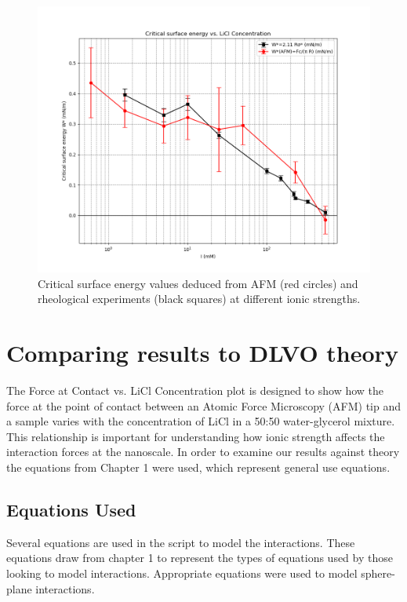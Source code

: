 \begin{figure}[h!]
\centering
\includegraphics[width=\textwidth]{chapter8/Rheology/Comparison graph.png}
\caption{Critical surface energy values deduced from AFM (red circles) and rheological experiments (black squares) at different ionic strengths.}
\label{fig:critical_surface_energy}
\end{figure}

\section{Comparing results to DLVO theory}


The Force at Contact vs. LiCl Concentration plot is designed to show how the force at the point of contact between an Atomic Force Microscopy (AFM) tip and a sample varies with the concentration of LiCl in a 50:50 water-glycerol mixture. This relationship is important for understanding how ionic strength affects the interaction forces at the nanoscale. In order to examine our results against theory the equations from Chapter 1 were used, which represent general use equations.

\subsection*{Equations Used}

Several equations are used in the script to model the interactions. These equations draw from chapter 1 to represent the types of equations used by those looking to model interactions. Appropriate equations were used to model sphere-plane interactions. 

